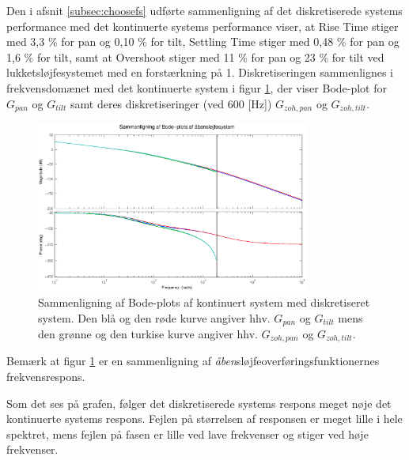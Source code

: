 Den i afsnit \ref{subsec:choosefs} udførte sammenligning af det diskretiserede systems performance
med det kontinuerte systems performance viser,
at Rise Time stiger med 3,3 \% for pan og 0,10 \% for tilt,
Settling Time stiger med 0,48 \% for pan og 1,6 \% for tilt,
samt at Overshoot stiger med 11 \% for pan og 23 \% for tilt
ved lukketsløjfesystemet med en forstærkning på 1.
Diskretiseringen sammenlignes i frekvensdomænet med det kontinuerte system
i figur \ref{fig:diskretBode}, der viser Bode-plot for \(G_{pan}\) og \(G_{tilt}\) samt
deres diskretiseringer (ved 600 [Hz]) \(G_{zoh,pan}\) og \(G_{zoh,tilt}\).
\begin{figure}[!th]
\centering
	\includegraphics[width=0.8\textwidth]{./graphics/diskretBode.eps}
	\captionsetup{width=0.7\textwidth}
\caption[Sammenligning af Bode-plots]
{Sammenligning af Bode-plots af kontinuert system med diskretiseret system.
Den blå og den røde kurve angiver hhv. \(G_{pan}\) og \(G_{tilt}\) mens
den grønne og den turkise kurve angiver hhv. \(G_{zoh,pan}\) og \(G_{zoh,tilt}\).
}
\label{fig:diskretBode}
\end{figure}
Bemærk at figur \ref{fig:diskretBode} er en sammenligning af \textit{åben}sløjfeoverføringsfunktionernes
frekvensrespons.

Som det ses på grafen, følger det diskretiserede systems respons meget nøje det kontinuerte systems respons.
Fejlen på størrelsen af responsen er meget lille i hele spektret,
mens fejlen på fasen er lille ved lave frekvenser og stiger ved høje frekvenser.

